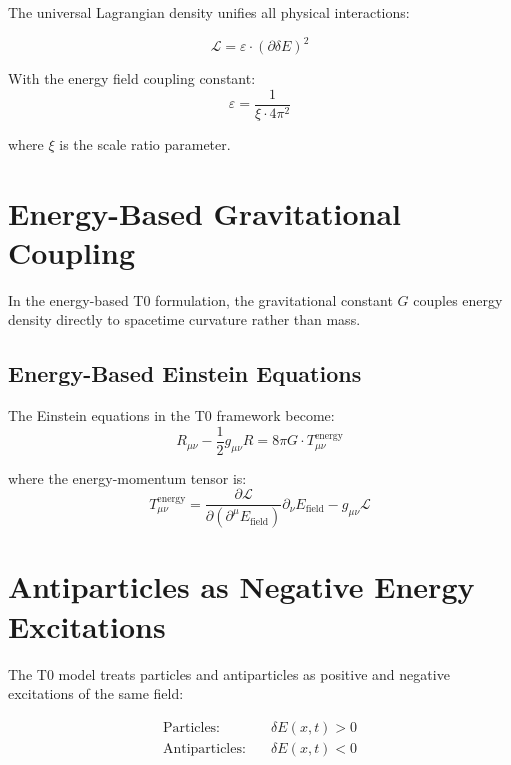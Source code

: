 \documentclass[12pt,a4paper]{report}
\begin{document}
	The universal Lagrangian density unifies all physical interactions:
	
	\begin{equation}
		\boxed{\mathcal{L} = \varepsilon \cdot (\partial \delta E)^2}
		\label{eq:universal_lagrangian_density}
	\end{equation}
	
	With the energy field coupling constant:
	\begin{equation}
		\varepsilon = \frac{1}{\xi \cdot 4\pi^2}
	\end{equation}
	
	where $\xi$ is the scale ratio parameter.
	
	\section{Energy-Based Gravitational Coupling}
	\label{sec:energy_gravitational_coupling}
	
	In the energy-based T0 formulation, the gravitational constant $G$ couples energy density directly to spacetime curvature rather than mass.
	
	\subsection{Energy-Based Einstein Equations}
	\label{subsec:energy_einstein_equations}
	
	The Einstein equations in the T0 framework become:
	\begin{equation}
		R_{\mu\nu} - \frac{1}{2}g_{\mu\nu}R = 8\pi G \cdot T_{\mu\nu}^{\text{energy}}
	\end{equation}
	
	where the energy-momentum tensor is:
	\begin{equation}
		T_{\mu\nu}^{\text{energy}} = \frac{\partial \mathcal{L}}{\partial (\partial^\mu E_{\text{field}})} \partial_\nu E_{\text{field}} - g_{\mu\nu} \mathcal{L}
	\end{equation}
	
	\section{Antiparticles as Negative Energy Excitations}
	\label{sec:antiparticles_negative_energy}
	
	The T0 model treats particles and antiparticles as positive and negative excitations of the same field:
	
	\begin{align}
		\text{Particles:} \quad &\delta E(x,t) > 0 \\
		\text{Antiparticles:} \quad &\delta E(x,t) < 0
	\end{align}
	
\end{document}

